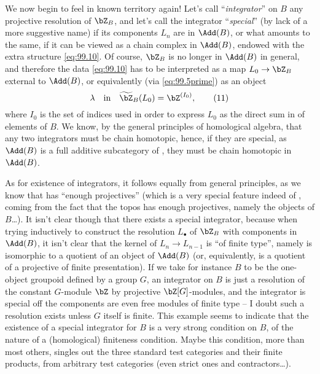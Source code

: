 We now begin to feel in known territory again! Let's call
``\emph{integrator}'' on $B$ any projective resolution of $\bZ_B$, and
let's call the integrator ``\emph{special}'' (by lack of a more
suggestive name) if its components $L_n$ are in $\Add(B)$, or what
amounts to the same, if it can be viewed as a chain complex in
$\Add(B)$, endowed with the extra structure \eqref{eq:99.10}. Of
course, $\bZ_B$ is no longer in $\Add(B)$ in general, and therefore
the data \eqref{eq:99.10} has to be interpreted as a map $L_0\to\bZ_B$
external to $\Add(B)$, or equivalently (via \eqref{eq:99.5prime}) as
an object
\begin{equation}
  \label{eq:99.11}
  \lambda\quad\text{in}\quad \widetilde{\bZ}_B(L_0) = \bZ^{(I_0)},\tag{11}
\end{equation}
where $I_0$ is the set of indices used in order to express $L_0$ as
the direct sum in \Bhatab{} of elements of $B$. We know, by the
general principles of homological algebra, that any two integrators
must be chain homotopic, hence, if they are special, as $\Add(B)$ is a
full additive subcategory of \Bhatab, they must be chain homotopic in
$\Add(B)$.

As for existence of integrators, it follows equally from general
principles, as we know that \Bhatab{} has ``enough projectives''
(which is a very special feature indeed of \Bhatab, coming from the
fact that the topos \Bhat{} has enough projectives, namely the objects
of $B$\ldots). It isn't clear though that there exists a special
integrator, because when trying inductively to construct the
resolution $L_\bullet$ of $\bZ_B$ with components in $\Add(B)$, it
isn't clear that the kernel of $L_n\to L_{n-1}$ is ``of finite type'',
namely is isomorphic to a quotient of an object of $\Add(B)$ (or,
equivalently, is a quotient of a projective of finite
presentation). If we take for instance $B$ to be the one-object
groupoid defined by a group $G$, an integrator on $B$ is just a
resolution of the constant $G$-module $\bZ$ by projective
$\bZ[G]$-modules, and the integrator is special of{f} the components
are even free modules of finite type -- I doubt such a resolution
exists unless $G$ itself is finite. This example seems to indicate
that the existence of a special integrator for $B$ is a very strong
condition on $B$, of the nature of a (homological) finiteness
condition. Maybe this condition, more than most others, singles out
the three standard test categories and their finite products, from
arbitrary test categories (even strict ones and contractors\ldots).

